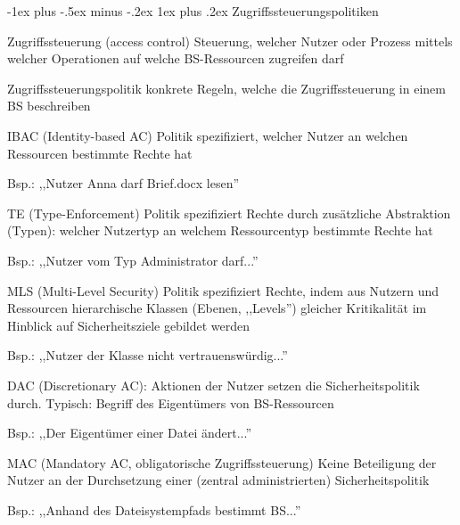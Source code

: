 \documentclass[a4paper]{article}
\makeatletter
\renewcommand{\subsubsection}{\@startsection{subsubsection}{3}{0mm}%
 {-1ex plus -.5ex minus -.2ex}%
 {1ex plus .2ex}%
 {\normalfont\small\bfseries}}
\makeatother
\begin{document}
\begin{multicols}{3}
    \subsubsection{Zugriffssteuerungspolitiken}
    \begin{description*}
        \item[Zugriffssteuerung] (access control) Steuerung, welcher Nutzer oder Prozess mittels welcher Operationen auf welche BS-Ressourcen zugreifen darf
        \item[Zugriffssteuerungspolitik] konkrete Regeln, welche die Zugriffssteuerung in einem BS beschreiben
        \item[IBAC] (Identity-based AC) Politik spezifiziert, welcher Nutzer an welchen Ressourcen bestimmte Rechte hat
        \begin{itemize*}
            \item Bsp.: ,,Nutzer Anna darf Brief.docx lesen''
        \end{itemize*}
        \item[TE] (Type-Enforcement) Politik spezifiziert Rechte durch zusätzliche Abstraktion (Typen): welcher Nutzertyp an welchem Ressourcentyp bestimmte Rechte hat
        \begin{itemize*}
            \item Bsp.: ,,Nutzer vom Typ Administrator darf...''
        \end{itemize*}
        \item[MLS] (Multi-Level Security) Politik spezifiziert Rechte, indem aus Nutzern und Ressourcen hierarchische Klassen (Ebenen, ,,Levels'') gleicher Kritikalität im Hinblick auf Sicherheitsziele gebildet werden
        \begin{itemize*}
            \item Bsp.: ,,Nutzer der Klasse nicht vertrauenswürdig...''
        \end{itemize*}
        \item[DAC] (Discretionary AC): Aktionen der Nutzer setzen die Sicherheitspolitik durch. Typisch: Begriff des Eigentümers von BS-Ressourcen
        \begin{itemize*}
            \item Bsp.: ,,Der Eigentümer einer Datei ändert...''
        \end{itemize*}
        \item[MAC] (Mandatory AC, obligatorische Zugriffssteuerung) Keine Beteiligung der Nutzer an der Durchsetzung einer (zentral administrierten) Sicherheitspolitik
        \begin{itemize*}
            \item Bsp.: ,,Anhand des Dateisystempfads bestimmt BS...''
        \end{itemize*}
    \end{description*}


\end{multicols}
\end{document}
